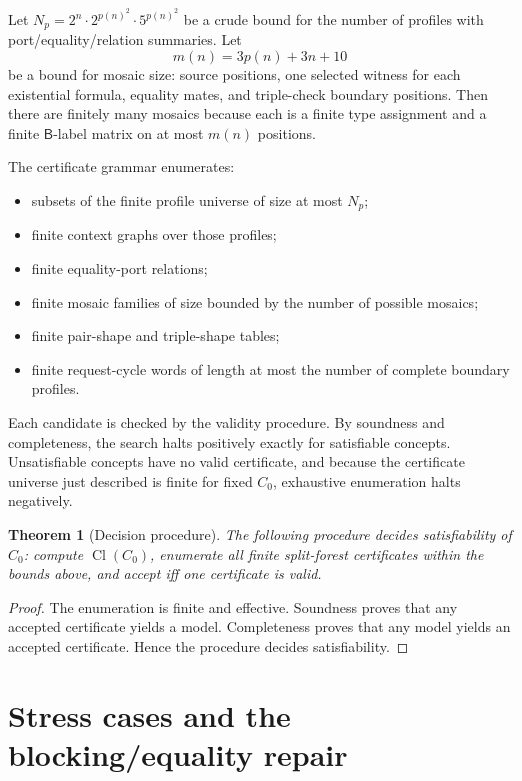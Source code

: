 \documentclass[11pt]{article}
\newtheorem{theorem}{Theorem}[section]
\newcommand{\Cl}{\operatorname{Cl}}
\newcommand{\Base}{\mathsf B}
\begin{document}
Let \(N_p=2^n\cdot 2^{p(n)^2}\cdot 5^{p(n)^2}\) be a crude bound for the number of profiles with port/equality/relation summaries.  Let
\[
  m(n)=3p(n)+3n+10
\]
be a bound for mosaic size: source positions, one selected witness for each existential formula, equality mates, and triple-check boundary positions.  Then there are finitely many mosaics because each is a finite type assignment and a finite \(\Base\)-label matrix on at most \(m(n)\) positions.

The certificate grammar enumerates:
\begin{itemize}
\item subsets of the finite profile universe of size at most \(N_p\);
\item finite context graphs over those profiles;
\item finite equality-port relations;
\item finite mosaic families of size bounded by the number of possible mosaics;
\item finite pair-shape and triple-shape tables;
\item finite request-cycle words of length at most the number of complete boundary profiles.
\end{itemize}
Each candidate is checked by the validity procedure.  By soundness and completeness, the search halts positively exactly for satisfiable concepts.  Unsatisfiable concepts have no valid certificate, and because the certificate universe just described is finite for fixed \(C_0\), exhaustive enumeration halts negatively.

\begin{theorem}[Decision procedure]
The following procedure decides satisfiability of \(C_0\): compute \(\Cl(C_0)\), enumerate all finite split-forest certificates within the bounds above, and accept iff one certificate is valid.
\end{theorem}

\begin{proof}
The enumeration is finite and effective.  Soundness proves that any accepted certificate yields a model.  Completeness proves that any model yields an accepted certificate.  Hence the procedure decides satisfiability.
\end{proof}

\section{Stress cases and the blocking/equality repair}
\end{document}
